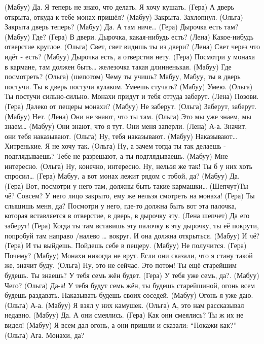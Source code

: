  (Мабуу)  Да. Я теперь не знаю, что делать. Я хочу кушать. 
 (Гера)   А дверь открыта, откуда к тебе монах пришёл?
 (Мабуу)  Закрыта. Захлопнул. 
 (Ольга)  Закрыта дверь теперь? 
 (Мабуу)  Да. А там ниче…
 (Гера)   Дырочка есть там?
 (Мабуу)  Где?
 (Гера)   В двери. Дырочка, какая-нибудь есть?
 (Лена)   Какое-нибудь отверстие круглое.
 (Ольга)  Свет, свет видишь ты из двери?
 (Лена)   Свет через что идёт - есть?
 (Мабуу)  Дырочка есть, а отверстия нету. 
 (Гера)   Посмотри у монаха в кармане, там должен быть… железочка такая длинненькая. 
 (Мабуу)  Где посмотреть?
 (Ольга) (шепотом) Чему ты учишь? Мабуу, Мабуу, ты в дверь постучи. Ты в дверь постучи кулаком. Умеешь стучать?
 (Мабуу) Умею.
 (Ольга) Ты постучи сильно-сильно. Монахи придут и тебя оттуда заберут.
 (Лена)  Позови. 
 (Гера)  Далеко от пещеры монахи?
 (Мабуу) Не заберут.
 (Ольга) Заберут, заберут. 
 (Мабуу) Нет.
 (Лена)  Они не знают, что ты там. 
 (Ольга) Это мы уже знаем, мы знаем…
 (Мабуу) Они знают, что я тут. Они меня заперли. 
 (Лена)  А-а. Значит, они тебя наказывают. 
 (Ольга) Ну, тебя наказывают. 
 (Мабуу) Наказывают…  Хитренькие. Я не хочу так. 
 (Ольга) Ну, а зачем тогда ты так делаешь - подглядываешь? Тебе не разрешают, а ты подглядываешь. 
 (Мабуу) Мне интересно. 
 (Ольга) Ну, конечно, интересно. Ну,  нельзя же так! Ты б у них хоть спросил…
 (Гера)  Мабуу,  а вот монах лежит рядом с тобой, да?  
 (Мабуу) Да.
 (Гера)  Вот, посмотри у него там, должны быть такие кармашки…
 (Шепчут)Ты чё? Совсем? У него лицо закрыто, ему же нельзя смотреть на монаха!
 (Гера)  Ты слышишь меня, да? Посмотри у него, где-то должна быть вот эта палочка, которая вставляется в отверстие, в дверь, в дырочку эту. 
 (Лена шепчет) Да его заберут!
 (Гера)  Когда ты там вставишь эту палочку в эту дырочку,  ты её покрути, попробуй там направо /налево … вокруг.  И она должна открыться. 
 (Мабуу) И чё?
 (Гера)  И ты выйдешь. Пойдешь  себе в пещеру.
 (Мабуу) Не получится. 
 (Гера)  Почему? 
 (Мабуу) Монахи никогда не врут. Если они сказали, что я стану такой же, значит буду. 
 (Ольга) Ну, это не сейчас. Это потом! Ты ещё старейшим будешь. Ты знаешь? У тебя семь жён будет. 
 (Гера)  У тебя уже семь, да?.
 (Мабуу) Чего? 
 (Ольга) Да-а! У тебя будут семь жён, ты будешь старейшиной, огонь всем будешь раздавать. Наказывать будешь своих соседей. 
 (Мабуу) Огонь я уже даю.  
 (Ольга) А-а.
 (Мабуу) Я взял у них камушек. 
 (Ольга) А, это нам рассказывал недавно.
 (Мабуу) Да. А они смеялись. 
 (Гера)  Как они смеялись? Ты ж их не видел! 
 (Мабуу) Я всем дал огонь, а они пришли и сказали: ``Покажи как?''
 (Ольга) Ага. Монахи, да?
